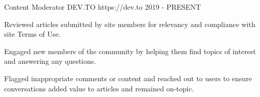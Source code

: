 

\begin {cventries}
  \cventry
    {Content Moderator} %
    {DEV.TO} %
    {https://dev.to} %
    {2019 - PRESENT} %
    {
      \begin{cvitems} %
        \item {Reviewed articles submitted by site members for relevancy and compliance with site Terms of Use.}
        \item {Engaged new members of the community by helping them find topics of interest and answering any questions.}
        \item {Flagged inappropriate comments or content and reached out to users to ensure conversations added value to articles and remained on-topic.}
      \end{cvitems}
    }

\end{cventries}
